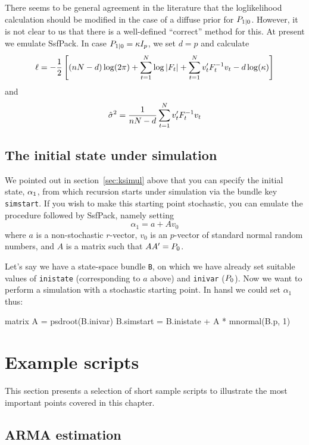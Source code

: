 There seems to be general agreement in the literature that the
loglikelihood calculation should be modified in the case of a diffuse
prior for $P_{1|0}$.  However, it is not clear to us that
there is a well-defined ``correct'' method for this.  At present we
emulate \textsf{SsfPack}.  In case
$P_{1|0} = \kappa I_p$, we set $d = p$ and calculate
%
\[
  \ell = -\frac{1}{2} \left[(nN-d) \log(2 \pi) + 
    \sum_{t=1}^N\log \left|F_t\right| + 
    \sum_{t=1}^Nv_t'F_t^{-1} v_t
    - d \log(\kappa)
  \right]
\]
%
and
%
\[
\hat{\sigma}^2 = \frac{1}{nN-d} 
   \sum_{t=1}^Nv_t'F_t^{-1} v_t
\]

\subsection{The initial state under simulation}
\label{sec:simstart}

We pointed out in section~\ref{sec:ksimul} above that you can specify
the initial state, $\alpha_1$, from which recursion starts under
simulation via the bundle key \texttt{simstart}. If you wish to make
this starting point stochastic, you can emulate the procedure followed
by \textsf{SsfPack}, namely setting
\[
\alpha_1 = a + A v_0
\]
where $a$ is a non-stochastic $r$-vector, $v_0$ is an $p$-vector
of standard normal random numbers, and $A$ is a matrix such
that $AA' = P_0$.

Let's say we have a state-space bundle \texttt{B}, on which we have
already set suitable values of \texttt{inistate} (corresponding to $a$
above) and \texttt{inivar} ($P_0$).  Now we want to
perform a simulation with a stochastic starting point. In hansl we
could set $\alpha_1$ thus:
%
\begin{code}
matrix A = psdroot(B.inivar)
B.simstart = B.inistate + A * mnormal(B.p, 1)
\end{code}

\section{Example scripts}
\label{sec:ss-examples}

This section presents a selection of short sample scripts to
illustrate the most important points covered in this chapter.

\subsection{ARMA estimation}
\label{sec:example_arma}

